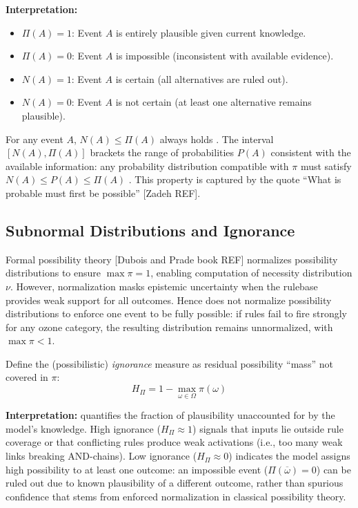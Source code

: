 \textbf{Interpretation:}
\begin{itemize}[leftmargin=2em]
\item $\Pi(A)=1$: Event $A$ is entirely plausible given current knowledge.
\item $\Pi(A)=0$: Event $A$ is impossible (inconsistent with available evidence).
\item $N(A)=1$: Event $A$ is certain (all alternatives are ruled out).
\item $N(A)=0$: Event $A$ is not certain (at least one alternative remains plausible).
\end{itemize}

For any event $A$, $N(A) \leq \Pi(A)$ always holds \citep{Dubois1988-nh}. The interval $[N(A), \Pi(A)]$ brackets the range of probabilities $P(A)$ consistent with the available information: any probability distribution compatible with $\pi$ must satisfy $N(A) \leq P(A) \leq \Pi(A)$ \citep{Dubois2006-MISSING}. This property is captured by the quote ``What is probable must first be possible'' [Zadeh REF].

\subsection{Subnormal Distributions and Ignorance}\label{sec:subnormal}

Formal possibility theory [Dubois and Prade book REF] normalizes possibility distributions to ensure $\max \pi = 1$, enabling computation of necessity distribution $\nu$. However, normalization masks epistemic uncertainty when the rulebase provides weak support for all outcomes. Hence \clyfar{} does not normalize possibility distributions to enforce one event to be fully possible: if rules fail to fire strongly for any ozone category, the resulting distribution remains unnormalized, with $\max \pi < 1$.

Define the (possibilistic) \textit{ignorance} measure \ign{} as residual possibility ``mass'' not covered in $\pi$:
\begin{equation}
H_\Pi = 1 - \max_{\omega \in \Omega} \pi(\omega) \label{eq:ignorance}
\end{equation}

\textbf{Interpretation:} \ign{} quantifies the fraction of plausibility unaccounted for by the model's knowledge. High ignorance ($H_\Pi \approx 1$) signals that inputs lie outside rule coverage or that conflicting rules produce weak activations (i.e., too many weak links breaking AND-chains). Low ignorance ($H_\Pi \approx 0$) indicates the model assigns high possibility to at least one outcome: an impossible event ($\Pi(\overline\omega) = 0$) can be ruled out due to known plausibility of a different outcome, rather than spurious confidence that stems from enforced normalization in classical possibility theory.

